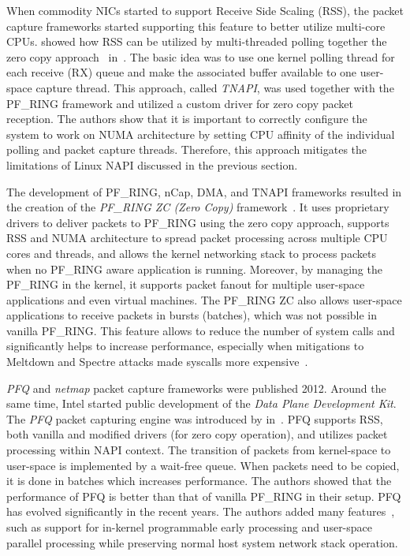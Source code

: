 When commodity NICs started to support Receive Side Scaling (RSS), the packet capture frameworks started supporting this feature to better utilize multi-core CPUs. \citeauthor{Fusco-2010-High} showed how RSS can be utilized by multi-threaded polling together the zero copy approach~\cite{Fusco-2010-High} in~\citeyear{Fusco-2010-High}. The basic idea was to use one kernel polling thread for each receive (RX) queue and make the associated buffer available to one user-space capture thread. This approach, called \emph{TNAPI}, was used together with the PF\_RING framework and utilized a custom driver for zero copy packet reception. The authors show that it is important to correctly configure the system to work on NUMA architecture by setting CPU affinity of the individual polling and packet capture threads. Therefore, this approach mitigates the limitations of Linux NAPI discussed in the previous section. 

The development of PF\_RING, nCap, DMA, and TNAPI frameworks resulted in the creation of the \emph{PF\_RING ZC (Zero Copy)} framework~\cite{ntop--PFRING}. It uses proprietary drivers to deliver packets to PF\_RING using the zero copy approach, supports RSS and NUMA architecture to spread packet processing across multiple CPU cores and threads, and allows the kernel networking stack to process packets when no PF\_RING aware application is running. Moreover, by managing the PF\_RING in the kernel, it supports packet fanout for multiple user-space applications and even virtual machines. The PF\_RING ZC also allows user-space applications to receive packets in bursts (batches), which was not possible in vanilla PF\_RING. This feature allows to reduce the number of system calls and significantly helps to increase performance, especially when mitigations to Meltdown and Spectre attacks made syscalls more expensive~\cite{Gregg-2018-KPTIKAISER}.

\emph{PFQ} and \emph{netmap} packet capture frameworks were published 2012. Around the same time, Intel started public development of the \emph{Data Plane Development Kit}. The \emph{PFQ} packet capturing engine was introduced by \citeauthor{Bonelli-2012-Multi} in~\cite{Bonelli-2012-Multi}. PFQ supports RSS, both vanilla and modified drivers (for zero copy operation), and utilizes packet processing within NAPI context. The transition of packets from kernel-space to user-space is implemented by a wait-free queue. When packets need to be copied, it is done in batches which increases performance. The authors showed that the performance of PFQ is better than that of vanilla PF\_RING in their setup. PFQ has evolved significantly in the recent years. The authors added many features~\cite{Bonelli-2014-Purely, Bonelli-2016-Network, Bonelli-2017-Enabling}, such as support for in-kernel programmable early processing and user-space parallel processing while preserving normal host system network stack operation.

